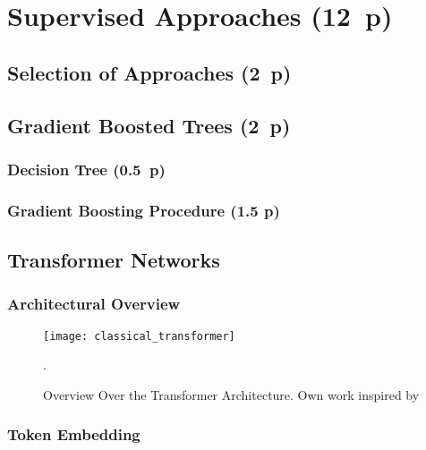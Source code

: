 \newpage
\section{Supervised Approaches (12~p)}\label{sec:supervised-approaches}

\subsection{Selection of Approaches (2~p)}\label{sec:selection-of-approaches}

\subsection{Gradient Boosted Trees (2~p)}\label{sec:gradient-boosted-trees}

\subsubsection{Decision Tree (0.5~p)}\label{sec:decision-tree}

\subsubsection{Gradient Boosting
  Procedure (1.5 p)}\label{sec:gradient-boosting-procedure}

\subsection{Transformer Networks}\label{sec:transformer-networks}

\subsubsection{Architectural Overview}\label{sec:architectural-overview}

\begin{landscape}
  \begin{figure}
    \begin{center}
      \texttt{[image: classical\_transformer]}
    \end{center}
    \caption[Overview Over the Transformer Architecture]{Overview Over the Transformer Architecture. Own work inspired by \textcite{daiTransformerXLAttentiveLanguage2019}}.
  \end{figure}
\end{landscape}

\subsubsection{Token Embedding}\label{sec:token-embeddings}

